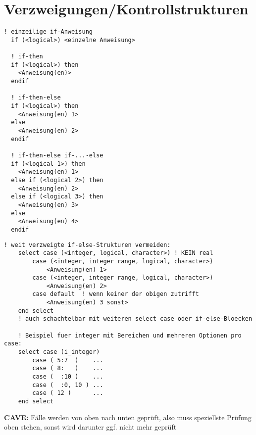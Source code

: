 \documentclass[a4paper, twocolumn]{scrarticle}
\begin{document}
\section{Verzweigungen/Kontrollstrukturen}
\begin{lstlisting}[caption={\bfseries Verzweigungen mit if}]
  ! einzeilige if-Anweisung
  if (<logical>) <einzelne Anweisung>
  
  ! if-then
  if (<logical>) then
    <Anweisung(en)>
  endif
  
  ! if-then-else
  if (<logical>) then
    <Anweisung(en) 1>
  else
    <Anweisung(en) 2>
  endif
  
  ! if-then-else if-...-else
  if (<logical 1>) then
    <Anweisung(en) 1>
  else if (<logical 2>) then
    <Anweisung(en) 2>
  else if (<logical 3>) then
    <Anweisung(en) 3>
  else
    <Anweisung(en) 4>
  endif
\end{lstlisting}
\begin{lstlisting}[caption={\bfseries Verzweigungen mit select case}]
	! weit verzweigte if-else-Strukturen vermeiden:
	select case (<integer, logical, character>) ! KEIN real
		case (<integer, integer range, logical, character>)
			<Anweisung(en) 1>
		case (<integer, integer range, logical, character>)
			<Anweisung(en) 2>
		case default  ! wenn keiner der obigen zutrifft
			<Anweisung(en) 3 sonst>
	end select
	! auch schachtelbar mit weiteren select case oder if-else-Bloecken
	
	! Beispiel fuer integer mit Bereichen und mehreren Optionen pro case:
	select case (i_integer)
		case ( 5:7  )    ...
		case ( 8:   )    ...
		case (  :10 )    ...
		case (  :0, 10 ) ...		
		case ( 12 )      ...
	end select
\end{lstlisting}
\textbf{CAVE:} Fälle werden von oben nach unten geprüft, also muss speziellste Prüfung oben stehen, sonst wird darunter ggf. nicht mehr geprüft
\end{document}
